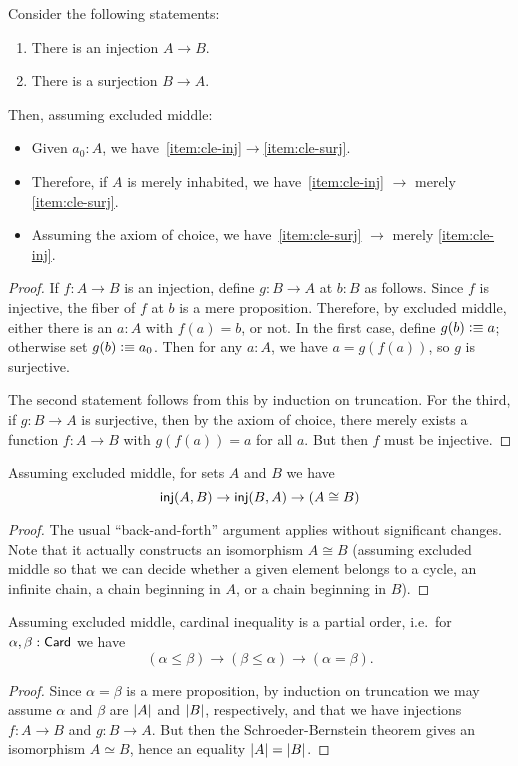 \begin{lem}\label{thm:injsurj}
  Consider the following statements:
  \begin{enumerate}
  \item There is an injection $A\to B$.\label{item:cle-inj}
  \item There is a surjection $B\to A$.\label{item:cle-surj}
  \end{enumerate}
  Then, assuming excluded middle:
  \begin{itemize}
  \item Given $a_0:A$, we have~\ref{item:cle-inj}$\to$\ref{item:cle-surj}.
  \item Therefore, if $A$ is merely inhabited, we have~\ref{item:cle-inj} $\to$ merely \ref{item:cle-surj}.
  \item Assuming the axiom of choice, we have~\ref{item:cle-surj} $\to$ merely \ref{item:cle-inj}.
  \end{itemize}
\end{lem}
\begin{proof}
  If $f:A\to B$ is an injection, define $g:B\to A$ at $b:B$ as follows.
  Since $f$ is injective, the fiber of $f$ at $b$ is a mere proposition.
  Therefore, by excluded middle, either there is an $a:A$ with $f(a)=b$, or not.
  In the first case, define $g(b)\vcentcolon\equiv a$; otherwise set $g(b)\vcentcolon\equiv a_0$.
  Then for any $a:A$, we have $a = g(f(a))$, so $g$ is surjective.

  The second statement follows from this by induction on truncation.
  For the third, if $g:B\to A$ is surjective, then by the axiom of choice, there merely exists a function $f:A\to B$ with $g(f(a)) = a$ for all $a$.
  But then $f$ must be injective.
\end{proof}

\begin{thm}
  Assuming excluded middle, for sets $A$ and $B$ we have
  \[ \mathsf{inj}(A,B) \to \mathsf{inj}(B,A) \to (A\cong B) \]
\end{thm}
\begin{proof}
  The usual ``back-and-forth'' argument applies without significant changes.
  Note that it actually constructs an isomorphism $A\cong B$ (assuming excluded middle so that we can decide whether a given element belongs to a cycle, an infinite chain, a chain beginning in $A$, or a chain beginning in $B$).
\end{proof}

\begin{cor}
  Assuming excluded middle, cardinal inequality is a partial order, i.e.\ for $\alpha,\beta:\mathsf{Card}$ we have
  \[ (\alpha\le\beta) \to (\beta\le\alpha) \to (\alpha=\beta). \]
\end{cor}
\begin{proof}
  Since $\alpha=\beta$ is a mere proposition, by induction on truncation we may assume $\alpha$ and $\beta$ are $\left|A\right|$ and $\left|B\right|$, respectively, and that we have injections $f:A\to B$ and $g:B\to A$.
  But then the Schroeder-Bernstein theorem gives an isomorphism $A\simeq B$, hence an equality $\left|A\right|=\left|B\right|$.
\end{proof}

